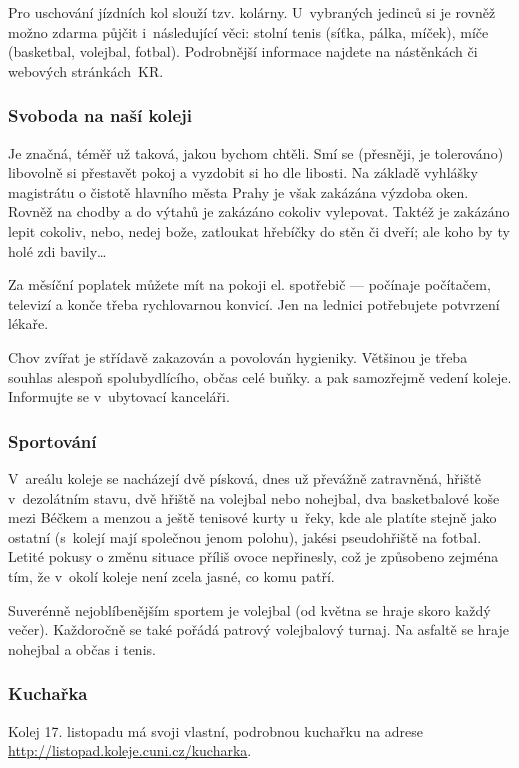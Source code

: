 Pro uschování jízdních kol slouží tzv.
kolárny. U~vybraných jedinců si je rovněž možno zdarma půjčit
i~následující věci: stolní tenis (síťka, pálka, míček), míče
(basketbal, volejbal, fotbal). Podrobnější informace najdete na
nástěnkách či webových stránkách~KR.

\subsubsection{Svoboda na naší koleji}

Je značná, téměř už taková, jakou bychom chtěli. Smí se (přesněji,
je tolerováno) libovolně si přestavět pokoj a vyzdobit si ho dle
libosti. Na základě vyhlášky magistrátu o čistotě hlavního města
Prahy je však zakázána výzdoba oken. Rovněž na chodby a do výtahů
je zakázáno cokoliv vylepovat. Taktéž je zakázáno lepit cokoliv,
nebo, nedej bože, zatloukat hřebíčky do stěn či dveří; ale koho by
ty holé zdi bavily\dots

Za měsíční poplatek můžete mít na pokoji el. spotřebič ---  počínaje
počítačem, televizí a konče třeba rychlovarnou konvicí. Jen na
lednici potřebujete potvrzení lékaře.

Chov zvířat je střídavě zakazován a povolován hygieniky. Většinou
je třeba souhlas alespoň spolubydlícího, občas celé buňky. a pak
samozřejmě vedení koleje. Informujte se v~ubytovací kanceláři.

\subsubsection{Sportování}

V~areálu koleje se nacházejí dvě písková, dnes už převážně
zatravněná, hřiště v~de\-zo\-lát\-ním stavu, dvě hřiště na volejbal nebo
nohejbal, dva basketbalové koše mezi Béčkem a menzou a ještě
tenisové kurty u~řeky, kde ale platíte stejně jako ostatní
(s~kolejí mají společnou jenom polohu), jakési pseudohřiště na
fotbal. Letité pokusy o změnu situace příliš ovoce nepřinesly, což
je způsobeno zejména tím, že v~okolí koleje není zcela jasné, co
komu patří.

Suverénně nejoblíbenějším sportem je volejbal (od května se hraje
skoro každý večer). Každoročně se také pořádá patrový volejbalový
turnaj. Na asfaltě se hraje nohejbal a občas i tenis.

\subsubsection{Kuchařka}
Kolej 17. listopadu má svoji vlastní, podrobnou kuchařku na adrese \url{http://listopad.koleje.cuni.cz/kucharka}.
